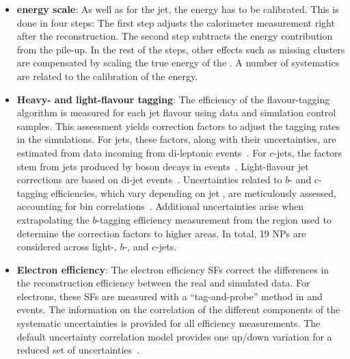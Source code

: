 \begin{itemize}

	\item \textbf{\tauhad energy scale}: As well as for the jet, the \tauhad energy has to be calibrated. 
		This is done in four steps: The first step adjusts the calorimeter measurement right after the 
		reconstruction. The second step subtracts the energy contribution from the pile-up. 
		In the rest of the steps, other effects such as missing clusters are compensated by scaling the 
		true energy of the \Ptau. 
		A number of systematics are related to the calibration of the \tauhad energy. 
		
		
	\item \textbf{Heavy- and light-flavour tagging}: The efficiency of the flavour-tagging algorithm is 
		 measured for each jet flavour using data and simulation control samples. This assessment 
		 yields correction factors to adjust the tagging rates in the simulations. For \btagged jets, 
		 these factors, along with their uncertainties, are estimated from data incoming from
		 di-leptonic \ttbar events~\cite{ATLAS:2017ywy,FTAG-2018-01}.
		 For $c$-jets, the factors stem from jets produced by \PW boson decays in \ttbar 
		 events~\cite{ATLAS-CONF-2018-001}. Light-flavour jet corrections are based on 
		 di-jet events~\cite{ATLAS-CONF-2018-006}. Uncertainties related to $b$- and 
		 $c$-tagging efficiencies, which vary depending on jet \pT, are meticulously assessed, 
		 accounting for bin correlations~\cite{FTAG-2018-01}.
		 Additional uncertainties arise when extrapolating the $b$-tagging efficiency measurement 
		 from the \pT region used to determine the correction factors to higher \pt areas. 
		 In total, 19 NPs are considered across light-, $b$-, and $c$-jets.
		 
	\item \textbf{Electron efficiency}: The electron efficiency SFs correct the differences in the reconstruction 
		efficiency between the real and simulated data.  For electrons, these SFs are measured with a 
		``tag-and-probe'' method in \Zepem and \Jee events. %
		The information on the correlation of the different components of the systematic 
		uncertainties is provided for all efficiency measurements. The default uncertainty correlation model
		provides one up/down variation for a reduced set of uncertainties~\cite{EGAM-2018-01,PERF-2017-01}.
			

\end{itemize}
